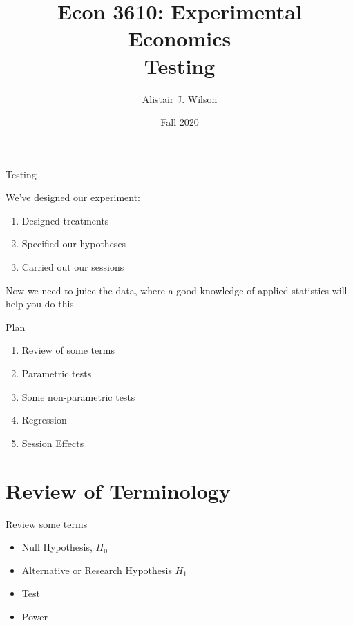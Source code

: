 \documentclass{beamer}
\begin{document}
\title{\LARGE Econ 3610: Experimental Economics \\ Testing}
\author{Alistair J. Wilson }
\date{Fall 2020}
 \maketitle

\begin{frame}{Testing}
\begin{card}
We've designed our experiment:
	\begin{enumerate}
		\item Designed treatments
		\item Specified our hypotheses
		\item Carried out our sessions
	\end{enumerate}
Now we need to juice the data, where a good knowledge of applied statistics will help you do this
\end{card}
\end{frame}


\begin{frame}{Plan}
\begin{card}
\begin{enumerate}
	\item Review of some terms
	\item Parametric tests
	\item Some non-parametric tests
	\item Regression
	\item Session Effects
\end{enumerate}
\end{card}
\end{frame}
\section{Review of Terminology}
\begin{frame}{Review some terms}
\begin{card}
	\begin{itemize}
		\item Null Hypothesis, $H_0$
		\item Alternative or Research Hypothesis $H_1$
		\item Test
		\item Power
	\end{itemize}
	\end{card}
\end{frame}
\end{document}
